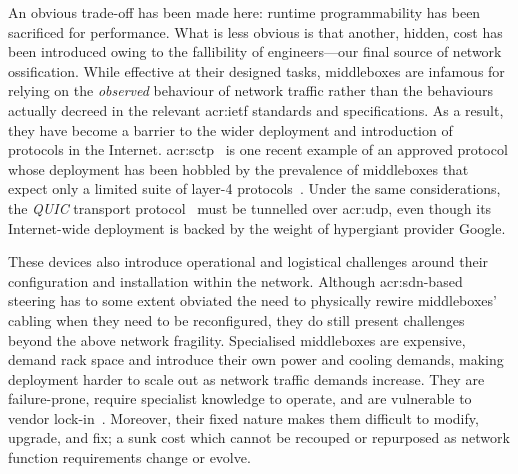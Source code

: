 An obvious trade-off has been made here: runtime programmability has been sacrificed for performance.
What is less obvious is that another, hidden, cost has been introduced owing to the fallibility of engineers---our final source of network ossification.
While effective at their designed tasks, middleboxes are infamous for relying on the \emph{observed} behaviour of network traffic rather than the behaviours actually decreed in the relevant \gls{acr:ietf} standards and specifications.
As a result, they have become a barrier to the wider deployment and introduction of protocols in the Internet.
\gls{acr:sctp}~\parencite{rfc4960} is one recent example of an approved protocol whose deployment has been hobbled by the prevalence of middleboxes that expect only a limited suite of layer-4 protocols~\parencite{sctp-middlebox-bad}.
Under the same considerations, the \emph{QUIC} transport protocol~\parencite{DBLP:conf/sigcomm/LangleyRWVKZYKS17} must be tunnelled over \gls{acr:udp}, even though its Internet-wide deployment is backed by the weight of hypergiant provider Google.

These devices also introduce operational and logistical challenges around their configuration and installation within the network.
Although \gls{acr:sdn}-based steering has to some extent obviated the need to physically rewire middleboxes' cabling when they need to be reconfigured, they do still present challenges beyond the above network fragility.
Specialised middleboxes are expensive, demand rack space and introduce their own power and cooling demands, making deployment harder to scale out as network traffic demands increase.
They are failure-prone, require specialist knowledge to operate, and are vulnerable to vendor lock-in~\parencite{DBLP:conf/sigcomm/SherryHSKRS12}.
Moreover, their fixed nature makes them difficult to modify, upgrade, and fix; a sunk cost which cannot be recouped or repurposed as network function requirements change or evolve.


